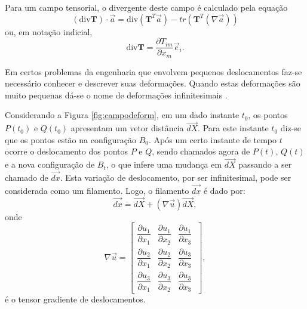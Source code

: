 Para um campo tensorial, o divergente deste campo é calculado pela equação
\begin{equation}
	(\mbox{div} \textbf{T}) \cdot \vec{a} = \mbox{div} ( \textbf{T} ^{T} \vec{a}) - tr ( \textbf{T} ^{T} ( { \nabla} \vec{a}))
\end{equation}
ou, em notação indicial,
\begin{equation}
	\mbox{div} \textbf{T} = \dfrac{ \partial T_{im}}{ \partial x_{m}} \vec{e} _{i}.
\end{equation}

Em certos problemas da engenharia que envolvem pequenos deslocamentos faz-se necessário conhecer e descrever suas deformações. Quando estas deformações são muito pequenas dá-se o nome de deformações infinitesimais \cite{Lai}.

Considerando a Figura \ref{fig:campodeform}, em um dado instante $ t_{0} $, os pontos $ P(t_{0}) $ e $ Q(t_{0}) $ apresentam um vetor distância $ \vec{dX} $. Para este instante $ t_{0} $ diz-se que os pontos estão na configuração $ B_{0} $. Após um certo instante de tempo $ t $ ocorre o deslocamento dos pontos $ P $ e $ Q $, sendo chamados agora de $ P(t) $, $ Q(t) $  e a nova configuração de $ B_{t} $, o que infere uma mudança em $  \vec{dX} $ passando a ser chamado de $  \vec{dx} $. Esta variação de deslocamento, por ser infinitesimal, pode ser considerada como um filamento. Logo, o filamento  $  \vec{dx} $ é dado por:
\begin{equation} \label{filamento}
	\vec{dx} = \vec{dX} + ( { \nabla} \vec{u}) \vec{dX},
\end{equation}
onde
\begin{equation}
	{ \nabla} \vec{u} = \left[
	\begin{array}{ccc}
		\dfrac{ \partial u_{1}}{ \partial x_{1}} & \dfrac{ \partial u_{1}}{ \partial x_{2}} & \dfrac{ \partial u_{1}}{ \partial x_{3}}\\
		
		\dfrac{ \partial u_{2}}{ \partial x_{1}} & \dfrac{ \partial u_{2}}{ \partial x_{2}} & \dfrac{ \partial u_{3}}{ \partial x_{3}}\\
		
		\dfrac{ \partial u_{3}}{ \partial x_{1}} & \dfrac{ \partial u_{3}}{ \partial x_{2}} & \dfrac{ \partial u_{3}}{ \partial x_{3}}\
	\end{array} \right],
\end{equation}
é o tensor gradiente de deslocamentos.

